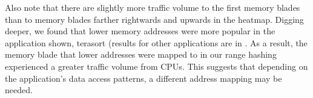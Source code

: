 Also note that there are slightly more traffic volume to the first memory blades than to memory blades farther rightwards and upwards in the heatmap. Digging deeper, we found that lower memory addresses were more popular in the application shown, terasort (results for other applications are in . As a result, the memory blade that lower addresses were mapped to in our range hashing experienced a greater traffic volume from CPUs. This suggests that depending on the application's data access patterns, a different address mapping may be needed.

